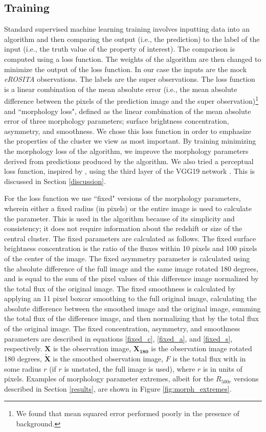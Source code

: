 \documentclass[twocolumn, 11pt]{aastex63}%
\begin{document}
\subsection{Training}\label{training}
Standard supervised machine learning training involves inputting data into an algorithm and then comparing the output (i.e., the prediction) to the label of the input (i.e., the truth value of the property of interest). The comparison is computed using a loss function. The weights of the algorithm are then changed to minimize the output of the loss function. In our case the inputs are the mock \textit{eROSITA} observations. The labels are the super observations. The loss function is a linear combination of the mean absolute error (i.e., the mean absolute difference between the pixels of the prediction image and the super observation)\footnote{We found that mean squared error performed poorly in the presence of background.} and ``morphology loss", defined as the linear combination of the mean absolute error of three morphology parameters; surface brightness concentration, asymmetry, and smoothness. We chose this loss function in order to emphasize the properties of the cluster we view as most important. By training minimizing the morphology loss of the algorithm, we improve the morphology parameters derived from predictions produced by the algorithm. We also tried a perceptual loss function, inspired by \citep{ploss}, using the third layer of the VGG19 network \citep{VGG19}. This is discussed in Section \ref{discussion}.

For the loss function we use ``fixed" versions of the morphology parameters, wherein either a fixed radius (in pixels) or the entire image is used to calculate the parameter. This is used in the algorithm because of its simplicity and consistency; it does not require information about the redshift or size of the central cluster. The fixed parameters are calculated as follows. The fixed surface brightness concentration is the ratio of the fluxes within 10 pixels and 100 pixels of the center of the image. The fixed asymmetry parameter is calculated using the absolute difference of the full image and the same image rotated 180 degrees, and is equal to the sum of the pixel values of this difference image normalized by the total flux of the original image. The fixed smoothness is calculated by applying an 11 pixel boxcar smoothing to the full original image, calculating the absolute difference between the smoothed image and the original image, summing the total flux of the difference image, and then normalizing that by the total flux of the original image. The fixed concentration, asymmetry, and smoothness parameters are described in equations \ref{fixed_c}, \ref{fixed_a}, and \ref{fixed_s}, respectively.  $\mathbf{X}$ is the observation image, $\mathbf{X_{180}}$ is the observation image rotated 180 degrees, $\mathbf{\tilde{X}}$ is the smoothed observation image, $F$ is the total flux with in some radius $r$ (if $r$ is unstated, the full image is used), where $r$ is in units of pixels. Examples of morphology parameter extremes, albeit for the $R_{500c}$ versions described in Section \ref{results}, are shown in Figure \ref{fig:morph_extremes}.
\end{document}
